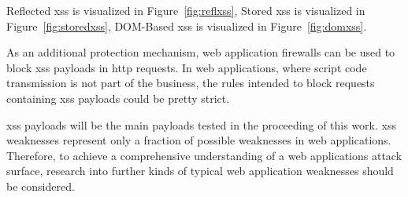 Reflected \acrshort{xss} is visualized in Figure~\ref{fig:reflxss}, Stored \acrshort{xss} is visualized in Figure~\ref{fig:storedxss}, DOM-Based \acrshort{xss} is visualized in Figure~\ref{fig:domxss}.

As an additional protection mechanism, web application firewalls can be used to block \acrshort{xss} payloads in \acrshort{http} requests. In web applications, where script code transmission is not part of the business, the rules intended to block requests containing \acrshort{xss} payloads could be pretty strict.

\acrshort{xss} payloads will be the main payloads tested in the proceeding of this work.
\acrshort{xss} weaknesses represent only a fraction of possible weaknesses in web applications. Therefore, to achieve a comprehensive understanding of a web applications attack surface, research into further kinds of typical web application weaknesses should be considered.

